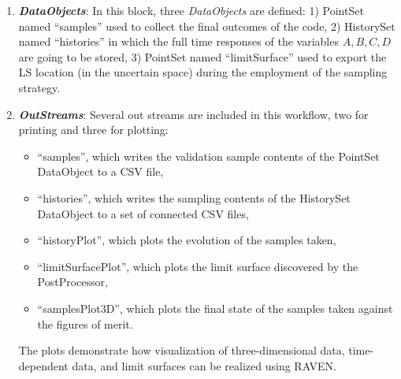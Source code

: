 \begin{enumerate}
   \item \textbf{\textit{DataObjects}}:
      In this block, three \textit{DataObjects} are defined: 1) PointSet
      named ``samples'' used to collect the final outcomes of the code, 2)
      HistorySet named ``histories'' in which the full time responses of the
      variables $A,B,C,D$ are going to be stored, 3) PointSet named
      ``limitSurface'' used  to export the LS location (in the uncertain space) during the employment of the sampling strategy.
   \item \textbf{\textit{OutStreams}}:
     Several out streams are included in this workflow, two for printing and three for plotting:
     \begin{itemize}
       \item ``samples'', which writes the validation sample contents of the  PointSet DataObject to a CSV file,
       \item ``histories'', which writes the sampling contents of the  HistorySet DataObject to a
         set of connected CSV files,
       \item ``historyPlot'', which plots the evolution of the samples taken,
       \item ``limitSurfacePlot'', which plots the limit surface discovered by the PostProcessor,
       \item ``samplesPlot3D'', which plots the final state of the samples taken against the figures of merit.
     \end{itemize}
     The plots demonstrate how visualization of three-dimensional data, time-dependent data, and limit
     surfaces can be realized using RAVEN.
 \begin{figure}[h!]
  \centering

\end{figure}
\end{enumerate}
